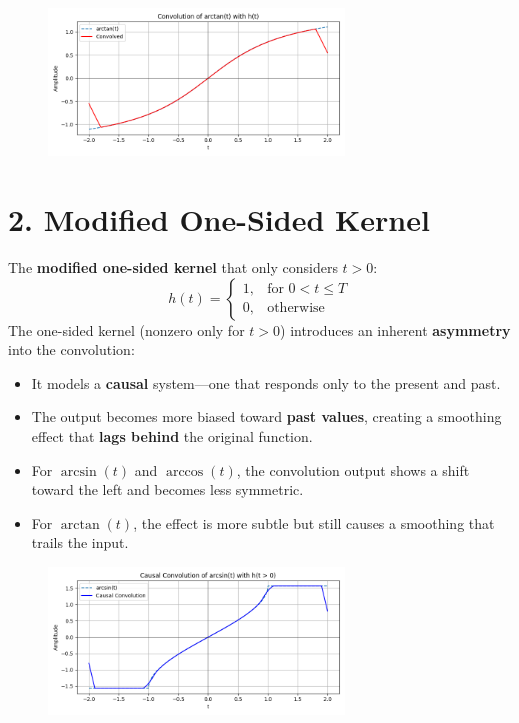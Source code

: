 \documentclass[12pt]{article}
\begin{document}
\begin{figure}[H]
    \centering
    \includegraphics[width=0.7\textwidth]{figs/org3.png}
\end{figure}
\section*{2. Modified One-Sided Kernel}
The \textbf{modified one-sided kernel} that only considers $t > 0$:
    \[
    h(t) = 
    \begin{cases}
        1, & \text{for } 0 < t \leq T \\
        0, & \text{otherwise}
    \end{cases}
    \]
The one-sided kernel (nonzero only for $t > 0$) introduces an inherent \textbf{asymmetry} into the convolution:
\begin{itemize}
    \item It models a \textbf{causal} system—one that responds only to the present and past.
    \item The output becomes more biased toward \textbf{past values}, creating a smoothing effect that \textbf{lags behind} the original function.
    \item For $\arcsin(t)$ and $\arccos(t)$, the convolution output shows a shift toward the left and becomes less symmetric.
    \item For $\arctan(t)$, the effect is more subtle but still causes a smoothing that trails the input.
\end{itemize}
\begin{figure}[H]
    \centering
    \includegraphics[width=0.7\textwidth]{figs/mod1.png}
\end{figure}
\end{document}
